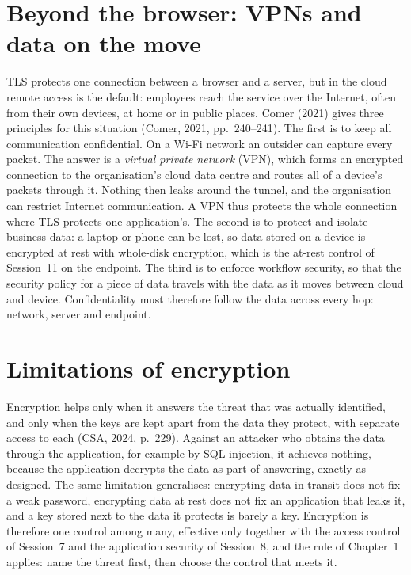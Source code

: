 \section{Beyond the browser: VPNs and data on the move}

TLS protects one connection between a browser and a server, but in the
cloud remote access is the default: employees reach the service over the
Internet, often from their own devices, at home or in public places. Comer
(2021) gives three principles for this situation (Comer, 2021,
pp.~240--241). The first is to keep all communication confidential. On a
Wi-Fi network an outsider can capture every packet. The answer is a
\emph{virtual private network} (VPN), which forms an encrypted connection to
the organisation's cloud data centre and routes all of a device's packets
through it. Nothing then leaks around the tunnel, and the organisation can
restrict Internet communication. A VPN thus protects the whole
connection where TLS protects one application's. The second is to protect
and isolate business data: a laptop or phone can be lost, so data stored on
a device is encrypted at rest with whole-disk encryption, which is the
at-rest control of Session~11 on the endpoint. The third is to enforce
workflow security, so that the security policy for a piece of data travels
with the data as it moves between cloud and device. Confidentiality must
therefore follow the data across every hop: network, server and endpoint.

\section{Limitations of encryption}

Encryption helps only when it answers the threat that was actually
identified, and only when the keys are kept apart from the data they
protect, with separate access to each (CSA, 2024, p.~229). Against an
attacker who obtains the data through the application, for example by SQL
injection, it achieves nothing, because the application decrypts the data as
part of answering, exactly as designed. The same limitation generalises:
encrypting data in transit does not fix a weak password, encrypting data at
rest does not fix an application that leaks it, and a key stored next to the
data it protects is barely a key. Encryption is therefore one control among
many, effective only together with the access control of Session~7 and the
application security of Session~8, and the rule of Chapter~1 applies: name
the threat first, then choose the control that meets it.

